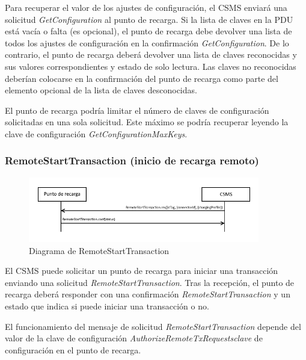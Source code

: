 \documentclass[12pt,a4paper,onecolumn,oneside]{report}
\begin{document}
Para recuperar el valor de los ajustes de configuración, el CSMS enviará una solicitud \textit{GetConfiguration} al punto de recarga. Si la lista de claves en la PDU está vacía o falta (es opcional), el punto de recarga debe devolver una lista de todos los ajustes de configuración en la confirmación \textit{GetConfiguration}. De lo contrario, el punto de recarga deberá devolver una lista de claves reconocidas y sus valores correspondientes y estado de solo lectura. Las claves no reconocidas deberían colocarse en la confirmación del punto de recarga como parte del elemento opcional de la lista de claves desconocidas.

El punto de recarga podría limitar el número de claves de configuración solicitadas en una sola solicitud. Este máximo se podría recuperar leyendo la clave de configuración \textit{GetConfigurationMaxKeys}.


\subsubsection{RemoteStartTransaction (inicio de recarga remoto)}
\label{RemoteStartTransaction (inicio de recarga remoto)}


\begin{figure}[h] 
\centering
  \includegraphics[width=0.9\textwidth]{figuras/diagramaremotestarttransaction.png}
  \caption[Diagrama de \textit{RemoteStartTransaction}]{Diagrama de RemoteStartTransaction\\
  }
  \label{fig:diagramaremotestarttransaction}
\end{figure}



El CSMS puede solicitar un punto de recarga para iniciar una transacción enviando una solicitud \textit{RemoteStartTransaction}. Tras la recepción, el punto de recarga deberá responder con una confirmación \textit{RemoteStartTransaction} y un estado que indica si puede iniciar una transacción o no.

El funcionamiento del mensaje de solicitud \textit{RemoteStartTransaction} depende del valor de la clave de configuración \textit{AuthorizeRemoteTxRequestsclave} de configuración en el punto de recarga.
\end{document}
